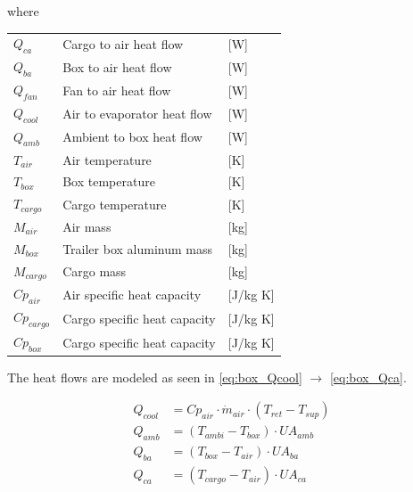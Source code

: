 where
\begin{center}
	\begin{tabular}{l p{8cm} l}
		$Q_{ca}$     & Cargo to air heat flow       & [\si{W}]                \\
		$Q_{ba}$     & Box to air heat flow         & [\si{W}]                \\
		$Q_{fan}$    & Fan to air heat flow         & [\si{W}]                \\
		$Q_{cool}$   & Air to evaporator heat flow  & [\si{W}]                \\
		$Q_{amb}$    & Ambient to box heat flow     & [\si{W}]                \\
		$T_{air}$    & Air temperature              & [\si{K}]                \\
		$T_{box}$    & Box temperature              & [\si{K}]                \\
		$T_{cargo}$  & Cargo temperature            & [\si{K}]                \\
		$M_{air}$    & Air mass                     & [\si{kg}]               \\
		$M_{box}$    & Trailer box aluminum mass    & [\si{kg}]               \\
		$M_{cargo}$  & Cargo mass                   & [\si{kg}]               \\
		$Cp_{air}$   & Air specific heat capacity   & [\si{J}/\si{kg} \si{K}] \\
		$Cp_{cargo}$ & Cargo specific heat capacity & [\si{J}/\si{kg} \si{K}] \\
		$Cp_{box}$   & Cargo specific heat capacity & [\si{J}/\si{kg} \si{K}]
	\end{tabular}
\end{center}


The heat flows are modeled as seen in \cref{eq:box_Qcool} $\rightarrow$ \cref{eq:box_Qca}.

\begin{align}
	Q_{cool}   & = Cp_{air} \cdot \dot{m}_{air} \cdot (T_{ret} - T_{sup})	\label{eq:box_Qcool} \\
	Q_{amb}    & = (T_{ambi} - T_{box}) \cdot U A_{amb}						\label{eq:box_Qab}   \\
	Q_{ba}     & = (T_{box} - T_{air}) \cdot U A_{ba}						\label{eq:box_Qba}   \\
	Q_{ca}     & = (T_{cargo} - T_{air}) \cdot U A_{ca}                  	\label{eq:box_Qca}
\end{align}

